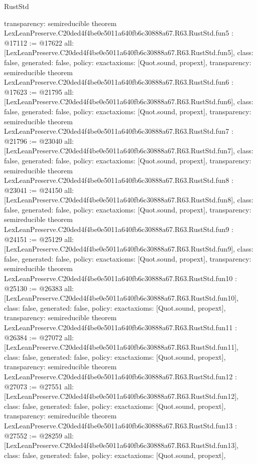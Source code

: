 \begin{lexlean}{RustStd}
\begin{coremodule}
{  transparency: semireducible
}
theorem LexLeanPreserve.C20ded4f4be0e5011a640fb6c30888a67.R63.RustStd.fun5 : @17112 := @17622 {
  all: [LexLeanPreserve.C20ded4f4be0e5011a640fb6c30888a67.R63.RustStd.fun5],
  class: false,
  generated: false,
  policy: exact{axioms: [Quot.sound, propext]},
  transparency: semireducible
}
theorem LexLeanPreserve.C20ded4f4be0e5011a640fb6c30888a67.R63.RustStd.fun6 : @17623 := @21795 {
  all: [LexLeanPreserve.C20ded4f4be0e5011a640fb6c30888a67.R63.RustStd.fun6],
  class: false,
  generated: false,
  policy: exact{axioms: [Quot.sound, propext]},
  transparency: semireducible
}
theorem LexLeanPreserve.C20ded4f4be0e5011a640fb6c30888a67.R63.RustStd.fun7 : @21796 := @23040 {
  all: [LexLeanPreserve.C20ded4f4be0e5011a640fb6c30888a67.R63.RustStd.fun7],
  class: false,
  generated: false,
  policy: exact{axioms: [Quot.sound, propext]},
  transparency: semireducible
}
theorem LexLeanPreserve.C20ded4f4be0e5011a640fb6c30888a67.R63.RustStd.fun8 : @23041 := @24150 {
  all: [LexLeanPreserve.C20ded4f4be0e5011a640fb6c30888a67.R63.RustStd.fun8],
  class: false,
  generated: false,
  policy: exact{axioms: [Quot.sound, propext]},
  transparency: semireducible
}
theorem LexLeanPreserve.C20ded4f4be0e5011a640fb6c30888a67.R63.RustStd.fun9 : @24151 := @25129 {
  all: [LexLeanPreserve.C20ded4f4be0e5011a640fb6c30888a67.R63.RustStd.fun9],
  class: false,
  generated: false,
  policy: exact{axioms: [Quot.sound, propext]},
  transparency: semireducible
}
theorem LexLeanPreserve.C20ded4f4be0e5011a640fb6c30888a67.R63.RustStd.fun10 : @25130 := @26383 {
  all: [LexLeanPreserve.C20ded4f4be0e5011a640fb6c30888a67.R63.RustStd.fun10],
  class: false,
  generated: false,
  policy: exact{axioms: [Quot.sound, propext]},
  transparency: semireducible
}
theorem LexLeanPreserve.C20ded4f4be0e5011a640fb6c30888a67.R63.RustStd.fun11 : @26384 := @27072 {
  all: [LexLeanPreserve.C20ded4f4be0e5011a640fb6c30888a67.R63.RustStd.fun11],
  class: false,
  generated: false,
  policy: exact{axioms: [Quot.sound, propext]},
  transparency: semireducible
}
theorem LexLeanPreserve.C20ded4f4be0e5011a640fb6c30888a67.R63.RustStd.fun12 : @27073 := @27551 {
  all: [LexLeanPreserve.C20ded4f4be0e5011a640fb6c30888a67.R63.RustStd.fun12],
  class: false,
  generated: false,
  policy: exact{axioms: [Quot.sound, propext]},
  transparency: semireducible
}
theorem LexLeanPreserve.C20ded4f4be0e5011a640fb6c30888a67.R63.RustStd.fun13 : @27552 := @28259 {
  all: [LexLeanPreserve.C20ded4f4be0e5011a640fb6c30888a67.R63.RustStd.fun13],
  class: false,
  generated: false,
  policy: exact{axioms: [Quot.sound, propext]},
}
\end{coremodule}
\end{lexlean}
